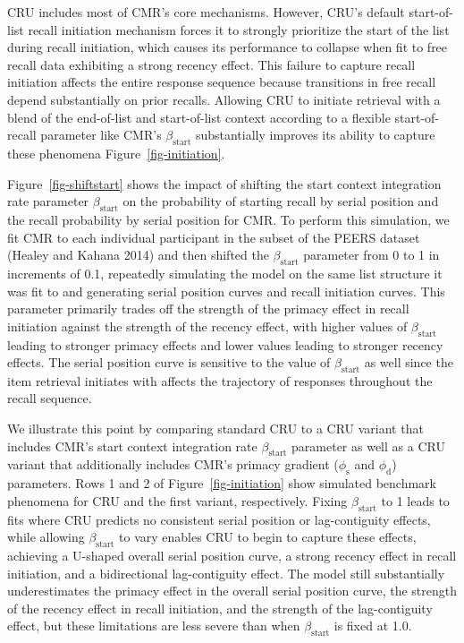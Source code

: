 \documentclass[
  letterpaper,
  DIV=11,
  numbers=noendperiod]{scrartcl}
\begin{document}
CRU includes most of CMR's core mechanisms. However, CRU's default
start-of-list recall initiation mechanism forces it to strongly
prioritize the start of the list during recall initiation, which causes
its performance to collapse when fit to free recall data exhibiting a
strong recency effect. This failure to capture recall initiation affects
the entire response sequence because transitions in free recall depend
substantially on prior recalls. Allowing CRU to initiate retrieval with
a blend of the end-of-list and start-of-list context according to a
flexible start-of-recall parameter like CMR's \(\beta_\text{start}\)
substantially improves its ability to capture these phenomena
Figure~\ref{fig-initiation}.

Figure~\ref{fig-shiftstart} shows the impact of shifting the start
context integration rate parameter \(\beta_\text{start}\) on the
probability of starting recall by serial position and the recall
probability by serial position for CMR. To perform this simulation, we
fit CMR to each individual participant in the subset of the PEERS
dataset (Healey and Kahana 2014) and then shifted the
\(\beta_\text{start}\) parameter from 0 to 1 in increments of 0.1,
repeatedly simulating the model on the same list structure it was fit to
and generating serial position curves and recall initiation curves. This
parameter primarily trades off the strength of the primacy effect in
recall initiation against the strength of the recency effect, with
higher values of \(\beta_\text{start}\) leading to stronger primacy
effects and lower values leading to stronger recency effects. The serial
position curve is sensitive to the value of \(\beta_\text{start}\) as
well since the item retrieval initiates with affects the trajectory of
responses throughout the recall sequence.

We illustrate this point by comparing standard CRU to a CRU variant that
includes CMR's start context integration rate \(\beta_\text{start}\)
parameter as well as a CRU variant that additionally includes CMR's
primacy gradient (\(\phi_\text{s}\) and \(\phi_\text{d}\)) parameters.
Rows 1 and 2 of Figure~\ref{fig-initiation} show simulated benchmark
phenomena for CRU and the first variant, respectively. Fixing
\(\beta_\text{start}\) to 1 leads to fits where CRU predicts no
consistent serial position or lag-contiguity effects, while allowing
\(\beta_\text{start}\) to vary enables CRU to begin to capture these
effects, achieving a U-shaped overall serial position curve, a strong
recency effect in recall initiation, and a bidirectional lag-contiguity
effect. The model still substantially underestimates the primacy effect
in the overall serial position curve, the strength of the recency effect
in recall initiation, and the strength of the lag-contiguity effect, but
these limitations are less severe than when \(\beta_\text{start}\) is
fixed at 1.0.
\end{document}

